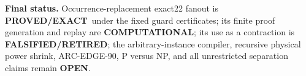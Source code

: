 \documentclass[11pt]{article}
\newcommand{\PROVED}{\textbf{PROVED/EXACT}}
\newcommand{\COMP}{\textbf{COMPUTATIONAL}}
\newcommand{\OPEN}{\textbf{OPEN}}
\newcommand{\FALSE}{\textbf{FALSIFIED/RETIRED}}
\begin{document}
\bigskip
\noindent\textbf{Final status.}
Occurrence-replacement exact22 fanout is \PROVED\ under the fixed guard
certificates; its finite proof generation and replay are \COMP; its use as a
contraction is \FALSE; the arbitrary-instance compiler, recursive physical
power shrink, ARC-EDGE-90, P versus NP, and all unrestricted separation
claims remain \OPEN.

\end{document}
